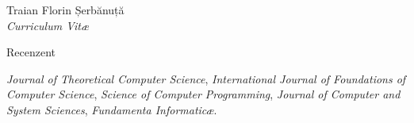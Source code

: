 \documentclass[10pt, romanian]{article}
\newenvironment{subbulletlist}{%
    \begin{list}{\labelitemii}{%
        \setlength{\topsep}{\itemsep}\setlength{\parskip}{\parsep}%
    }%
}%
{ \end{list} }
\begin{document}
\begin{cv}{Traian Florin Șerbănuță\\{\large \itshape Curriculum Vit\ae}}
%
%

\begin{cvlist}{Recenzent}
        \item \textit{Journal of Theoretical Computer Science}, \textit{International Journal of Foundations of Computer Science}, \textit{Science of Computer Programming}, \textit{Journal of Computer and System Sciences}, \textit{Fundamenta Informatic\ae}.
        \item  
\end{cvlist}


\setlength{\oldcvlabelwidth}{\cvlabelwidth}
\setlength{\cvlabelwidth}{1em}
\setlength{\cvlabelwidth}{\oldcvlabelwidth}






\end{cv}
\end{document}
